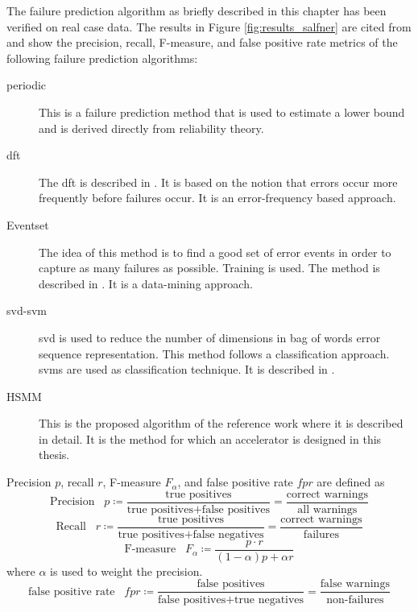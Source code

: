 \documentclass[mscthesis]{usiinfthesis}
\begin{document}
The failure prediction algorithm as briefly described in this chapter has been
verified on real case data. The results in Figure \ref{fig:results_salfner} are
cited from \cite{salfner08} and show the precision, recall, F-measure, and false
positive rate metrics of the following failure prediction algorithms:
\begin{description}
    \item[periodic] This is a failure prediction method that is used to estimate
        a lower bound and is derived directly from reliability theory.
    \item[\acrshort{dft}] The \acrfull{dft} is described in \cite{lin88}. It is
        based on the notion that errors occur more frequently before failures
        occur. It is an error-frequency based approach.
    \item[Eventset] The idea of this method is to find a good set of error
        events in order to capture as many failures as possible. Training is
        used. The method is described in \cite{ICDM02_Vilalta}. It is
        a data-mining approach.
    \item[\acrshort{svd}-\acrshort{svm}] \acrfull{svd} is used to reduce the
        number of dimensions in bag of words error sequence representation.
        This method follows a classification approach. \glspl{svm} are used
        as classification technique. It is described in \cite{domeniconi02}.
    \item[HSMM] This is the proposed algorithm of the reference work
        \cite{salfner08} where it is described in detail. It is the method for
        which an accelerator is designed in this thesis.
\end{description}
Precision $p$, recall $r$, F-measure $F_\alpha$, and false positive rate $fpr$
are defined as
\begin{equation}
    \text{Precision} \;\;\; p
        \coloneqq \frac{\text{true positives}}{\text{true positives}
        +\text{false positives}}
        = \frac{\text{correct warnings}}{\text{all warnings}}
\end{equation}
\begin{equation}
    \text{Recall} \;\;\; r 
        \coloneqq \frac{\text{true positives}}{\text{true positives}
        +\text{false negatives}}
        = \frac{\text{correct warnings}}{\text{failures}}
\end{equation}
\begin{equation}
    \text{F-measure} \;\;\; F_{\alpha}
        \coloneqq \frac{p \cdot r}{(1-\alpha)p + \alpha r}
\end{equation}
where $\alpha$ is used to weight the precision.
\begin{equation}
    \text{false positive rate} \;\;\; fpr
    \coloneqq \frac{\text{false positives}}
        {\text{false positives}+\text{true negatives}}
        = \frac{\text{false warnings}}{\text{non-failures}}
\end{equation}
\end{document}
